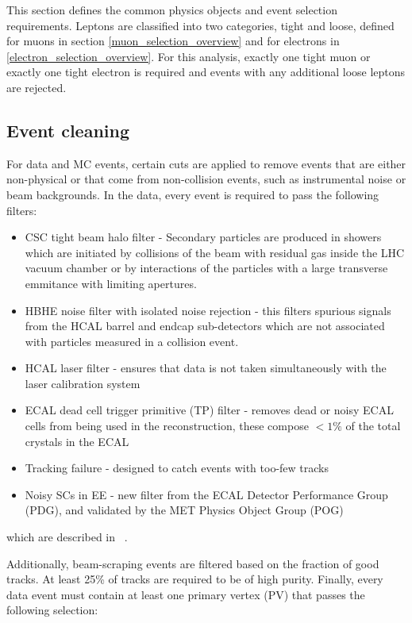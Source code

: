 \par This section defines the common physics objects and event
selection requirements.  Leptons are classified into two categories,
tight and loose, defined for muons in section
\ref{muon_selection_overview} and for electrons in
\ref{electron_selection_overview}.  For this analysis, exactly one
tight muon or exactly one tight electron is required and events with
any additional loose leptons are rejected. 


\subsection{Event cleaning}
\label{event_cleaning_overview}

\par For data and MC events, certain cuts are applied to remove events
that are either non-physical or that come from non-collision events,
such as instrumental noise or beam backgrounds.  In the data, every
event is required to pass the following filters:

\begin{itemize}
  \item CSC tight beam halo filter - Secondary particles are produced
    in showers which are initiated by collisions of the beam with
    residual gas inside the LHC vacuum chamber or by interactions of
    the particles with a large transverse emmitance with limiting
    apertures.   
  \item HBHE noise filter with isolated noise rejection - this filters
    spurious signals from the HCAL barrel and endcap sub-detectors which
    are not associated with particles measured in a collision event. 
  \item HCAL laser filter - ensures that data is not taken
    simultaneously with the laser calibration system
  \item ECAL dead cell trigger primitive (TP) filter - removes dead
    or noisy ECAL cells from being used in the reconstruction, these
    compose $<1\%$ of the total crystals in the ECAL
  \item Tracking failure - designed to catch events with too-few tracks
  \item Noisy SCs in EE - new filter from the ECAL Detector
    Performance Group (PDG), and validated by the MET Physics Object
    Group (POG)
\end{itemize}

\noindent which are described in ~\cite{METfilters}.

\par Additionally, beam-scraping events are filtered based on the fraction
of good tracks.  At least 25\% of tracks are required to be of high
purity.  Finally, every data event must contain at least one primary
vertex (PV) that passes the following selection:

